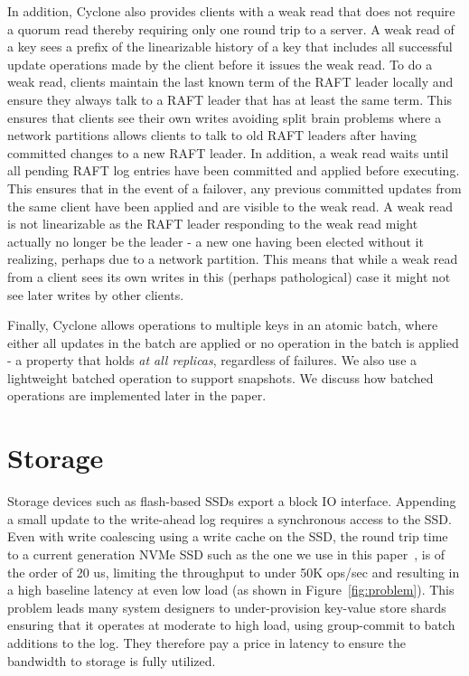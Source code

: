 \documentclass[twocolumn]{article}
\begin{document}
In addition, Cyclone also provides clients with a weak read that does not require a 
quorum read thereby requiring only one round trip to a server.  A weak read of a key sees a prefix of the linearizable history of a key that 
includes all successful update operations made by the client before it issues the 
weak read. To do a weak read, 
clients maintain the last known term of the RAFT leader locally and ensure they always talk
to a RAFT leader that has at least the same term. This ensures that clients see their own writes
avoiding split brain problems where a network partitions allows clients to
talk to old RAFT leaders after having committed changes to a new RAFT leader. In addition, a weak read waits until all pending RAFT log entries have been committed and applied before executing. This ensures that in the event of a failover, any previous committed updates from the same client have been applied and are visible to the weak read. A weak read is not linearizable as the RAFT leader responding to the weak read might actually no longer be the leader - a new one having been elected 
without it realizing, perhaps due to a network partition. This means that while a weak read from a client sees its own writes in this (perhaps pathological) case it might not see later writes by other clients.

Finally, Cyclone allows operations to multiple keys in an atomic batch, where
either all updates in the batch are applied or no operation in the batch is
applied - a property that holds \emph{at all replicas}, regardless of failures. We also use a lightweight batched operation to support snapshots. We discuss how batched operations are implemented later in the paper.


\section{Storage}
\label{sec:storage}
Storage devices such as flash-based SSDs export a block IO interface. Appending
a small update to the write-ahead log requires a synchronous access to the
SSD. Even with write coalescing using a write cache on the SSD, the round trip
time to a current generation NVMe SSD such as the one we use in this
paper~\cite{ssd_spec}, is of the order of 20 us, limiting the throughput to
under 50K ops/sec and resulting in a high baseline latency at even low load (as
shown in Figure~\ref{fig:problem}). This problem leads many system designers to
under-provision key-value store shards ensuring that it operates at moderate to
high load, using group-commit to batch additions to the log. They therefore pay
a price in latency to ensure the bandwidth to storage is fully utilized.
\end{document}
